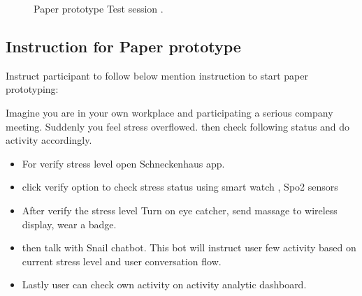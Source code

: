 \begin{figure}[hbt!] 
  \centering
  \qquad
    \qquad
  \caption[Paper prototype Test session ]{Paper prototype Test session .}
  \label{fig:Poster}
\end{figure}


\subsection*{Instruction for Paper prototype}

Instruct participant to follow below mention instruction to start paper prototyping:

Imagine you are in your own workplace and participating a serious company meeting. Suddenly you feel stress overflowed. then check following status and do activity accordingly.
\begin{itemize}
    \item For verify stress level open Schneckenhaus app. 
    \item click verify option to check stress status using smart watch , Spo2 sensors
    \item After verify the stress level Turn on eye catcher, send massage to wireless display, wear a badge.
    \item then talk with Snail chatbot. This bot will instruct user few activity based on current stress level and user conversation flow.
    \item Lastly user can check own activity on activity analytic dashboard.
\end{itemize}

